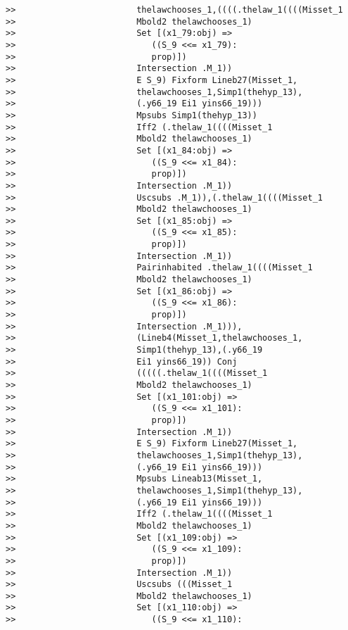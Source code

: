 \documentclass[12pt]{article}
\begin{document}
\begin{verbatim}
>>                        thelawchooses_1,((((.thelaw_1((((Misset_1
>>                        Mbold2 thelawchooses_1)
>>                        Set [(x1_79:obj) =>
>>                           ((S_9 <<= x1_79):
>>                           prop)])
>>                        Intersection .M_1))
>>                        E S_9) Fixform Lineb27(Misset_1,
>>                        thelawchooses_1,Simp1(thehyp_13),
>>                        (.y66_19 Ei1 yins66_19)))
>>                        Mpsubs Simp1(thehyp_13))
>>                        Iff2 (.thelaw_1((((Misset_1
>>                        Mbold2 thelawchooses_1)
>>                        Set [(x1_84:obj) =>
>>                           ((S_9 <<= x1_84):
>>                           prop)])
>>                        Intersection .M_1))
>>                        Uscsubs .M_1)),(.thelaw_1((((Misset_1
>>                        Mbold2 thelawchooses_1)
>>                        Set [(x1_85:obj) =>
>>                           ((S_9 <<= x1_85):
>>                           prop)])
>>                        Intersection .M_1))
>>                        Pairinhabited .thelaw_1((((Misset_1
>>                        Mbold2 thelawchooses_1)
>>                        Set [(x1_86:obj) =>
>>                           ((S_9 <<= x1_86):
>>                           prop)])
>>                        Intersection .M_1))),
>>                        (Lineb4(Misset_1,thelawchooses_1,
>>                        Simp1(thehyp_13),(.y66_19
>>                        Ei1 yins66_19)) Conj
>>                        (((((.thelaw_1((((Misset_1
>>                        Mbold2 thelawchooses_1)
>>                        Set [(x1_101:obj) =>
>>                           ((S_9 <<= x1_101):
>>                           prop)])
>>                        Intersection .M_1))
>>                        E S_9) Fixform Lineb27(Misset_1,
>>                        thelawchooses_1,Simp1(thehyp_13),
>>                        (.y66_19 Ei1 yins66_19)))
>>                        Mpsubs Lineab13(Misset_1,
>>                        thelawchooses_1,Simp1(thehyp_13),
>>                        (.y66_19 Ei1 yins66_19)))
>>                        Iff2 (.thelaw_1((((Misset_1
>>                        Mbold2 thelawchooses_1)
>>                        Set [(x1_109:obj) =>
>>                           ((S_9 <<= x1_109):
>>                           prop)])
>>                        Intersection .M_1))
>>                        Uscsubs (((Misset_1
>>                        Mbold2 thelawchooses_1)
>>                        Set [(x1_110:obj) =>
>>                           ((S_9 <<= x1_110):

\end{verbatim}
\end{document}
